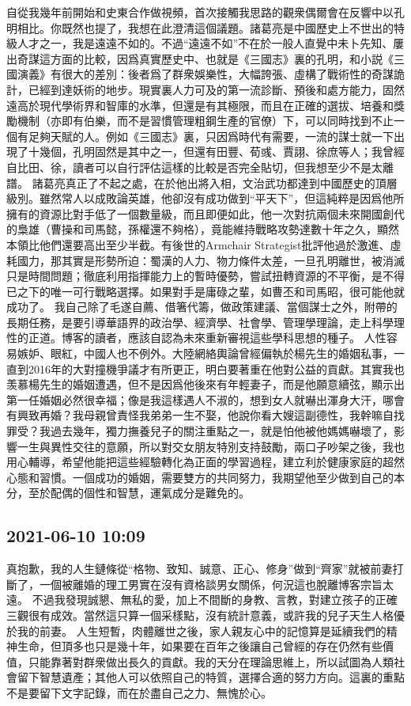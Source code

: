 \documentclass[twocolumn]{ctexart}
\begin{document}
自從我幾年前開始和史東合作做視頻，首次接觸我思路的觀衆偶爾會在反響中以孔明相比。你既然也提了，我想在此澄清這個議題。諸葛亮是中國歷史上不世出的特級人才之一，我是遠遠不如的。不過“遠遠不如”不在於一般人直覺中未卜先知、屢出奇謀這方面的比較，因爲真實歷史中、也就是《三國志》裏的孔明，和小説《三國演義》有很大的差別：後者爲了群衆娛樂性，大幅誇張、虛構了戰術性的奇謀詭計，已經到達妖術的地步。現實裏人力可及的第一流診斷、預後和處方能力，固然遠高於現代學術界和智庫的水準，但還是有其極限，而且在正確的選拔、培養和獎勵機制（亦即有伯樂，而不是習慣管理粗鋼生產的官僚）下，可以同時找到不止一個有足夠天賦的人。例如《三國志》裏，只因爲時代有需要，一流的謀士就一下出現了十幾個，孔明固然是其中之一，但還有田豐、荀彧、賈詡、徐庶等人；我曾經自比田、徐，讀者可以自行評估這樣的比較是否完全貼切，但我想至少不是太離譜。
諸葛亮真正了不起之處，在於他出將入相，文治武功都達到中國歷史的頂層級別。雖然常人以成敗論英雄，他卻沒有成功做到“平天下”，但這純粹是因爲他所擁有的資源比對手低了一個數量級，而且即便如此，他一次對抗兩個未來開國創代的梟雄（曹操和司馬懿，孫權還不夠格），竟能維持戰略攻勢達數十年之久，顯然本領比他們還要高出至少半截。有後世的Armchair Strategist批評他過於激進、虛耗國力，那其實是形勢所迫：蜀漢的人力、物力條件太差，一旦孔明離世，被消滅只是時間問題；徹底利用指揮能力上的暫時優勢，嘗試扭轉資源的不平衡，是不得已之下的唯一可行戰略選擇。如果對手是庸碌之輩，如曹丕和司馬昭，很可能他就成功了。
我自己除了毛遂自薦、借箸代籌，做政策建議、當個謀士之外，附帶的長期任務，是要引導華語界的政治學、經濟學、社會學、管理學理論，走上科學理性的正道。博客的讀者，應該自認為未來重新審視這些學科思想的種子。
人性容易嫉妒、眼紅，中國人也不例外。大陸網絡輿論曾經偏執於楊先生的婚姻私事，一直到2016年的大對撞機爭議才有所更正，明白要著重在他對公益的貢獻。其實我也羡慕楊先生的婚姻遭遇，但不是因爲他後來有年輕妻子，而是他願意續弦，顯示出第一任婚姻必然很幸福；像是我這樣遇人不淑的，想到女人就嚇出渾身大汗，哪會有興致再婚？我母親曾責怪我弟弟一生不娶，他說你看大嫂這副德性，我幹嘛自找罪受？我過去幾年，獨力撫養兒子的關注重點之一，就是怕他被他媽媽嚇壞了，影響一生與異性交往的意願，所以對交女朋友特別支持鼓勵，兩口子吵架之後，我也用心輔導，希望他能把這些經驗轉化為正面的學習過程，建立利於健康家庭的超然心態和習慣。一個成功的婚姻，需要雙方的共同努力，我期望他至少做到自己的本分，至於配偶的個性和智慧，運氣成分是難免的。
\subsection*{2021-06-10 10:09}

真抱歉，我的人生鏈條從“格物、致知、誠意、正心、修身”做到“齊家”就被前妻打斷了，一個被離婚的理工男實在沒有資格談男女關係，何況這也脫離博客宗旨太遠。
不過我發現誠懇、無私的愛，加上不間斷的身教、言教，對建立孩子的正確三觀很有成效。當然這只算一個采樣點，沒有統計意義，或許我的兒子天生人格優於我的前妻。
人生短暫，肉體離世之後，家人親友心中的記憶算是延續我們的精神生命，但頂多也只是幾十年，如果要在百年之後讓自己曾經的存在仍然有些價值，只能靠著對群衆做出長久的貢獻。我的天分在理論思維上，所以試圖為人類社會留下智慧遺產；其他人可以依照自己的特質，選擇合適的努力方向。這裏的重點不是要留下文字記錄，而在於盡自己之力、無愧於心。
\end{document}
